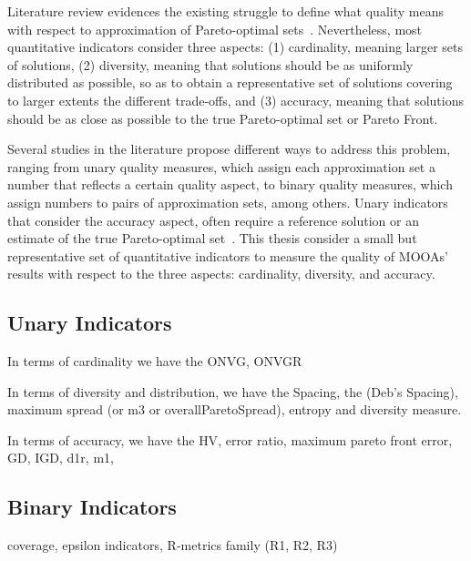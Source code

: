 Literature review evidences the existing struggle to define what quality means with respect to approximation of Pareto-optimal sets~\cite{Knowles2002Metrics,Riquelme2015}. Nevertheless, most quantitative indicators consider three aspects: (1) cardinality, meaning larger sets of solutions, (2) diversity, meaning that solutions should be as uniformly distributed as possible, so as to obtain a representative set of solutions covering to larger extents the different trade-offs, and (3) accuracy, meaning that solutions should be as close as possible to the true Pareto-optimal set or Pareto Front. 

Several studies in the literature propose different ways to address this problem, ranging from unary quality measures, which assign each approximation set a number that reflects a certain quality aspect, to binary quality measures, which assign numbers to pairs of approximation sets, among others. Unary indicators that consider the accuracy aspect, often require a reference solution or an estimate of the true Pareto-optimal set~\cite{Zitzler2003Metrics,Riquelme2015}. This thesis consider a small but representative set of quantitative indicators to measure the quality of \acp{MOOA}' results with respect to the three aspects: cardinality, diversity, and accuracy. 

\subsection{Unary Indicators}

In terms of cardinality we have the \ac{ONVG}, \ac{ONVGR}



In terms of diversity and distribution, we have the Spacing, the \Delta (Deb's Spacing), maximum spread (or m3 or overallParetoSpread), entropy and diversity measure.


In terms of accuracy, we have the \ac{HV}, error ratio, maximum pareto front error, \ac{GD}, \ac{IGD}, d1r,  m1,
\subsection{Binary Indicators}

coverage, epsilon indicators, R-metrics family (R1, R2, R3)

